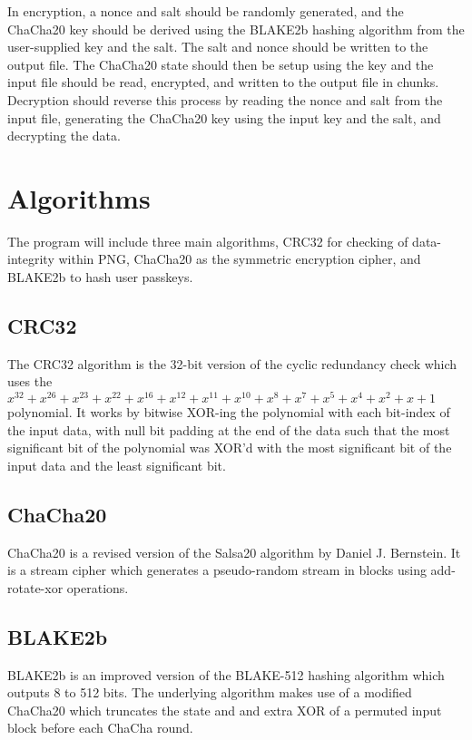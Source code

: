 \documentclass{report}
\begin{document}
In encryption, a nonce and salt should be randomly generated, and the ChaCha20 key should be derived using the BLAKE2b hashing algorithm from the user-supplied key and the salt. The salt and nonce should be written to the output file. The ChaCha20 state should then be setup using the key and the input file should be read, encrypted, and written to the output file in chunks.
Decryption should reverse this process by reading the nonce and salt from the input file, generating the ChaCha20 key using the input key and the salt, and decrypting the data.

\section{Algorithms}

The program will include three main algorithms, CRC32 for checking of data-integrity within PNG, ChaCha20 as the symmetric encryption cipher, and BLAKE2b to hash user passkeys.

\subsection{CRC32}

The CRC32 algorithm is the 32-bit version of the cyclic redundancy check which uses the $x^{32}+x^{26}+x^{23}+x^{22}+x^{16}+x^{12}+x^{11}+x^{10}+x^8+x^7+x^5+x^4+x^2+x+1$ polynomial. It works by bitwise XOR-ing the polynomial with each bit-index of the input data, with null bit padding at the end of the data such that the most significant bit of the polynomial was XOR'd with the most significant bit of the input data and the least significant bit. 

\subsection{ChaCha20}

ChaCha20 is a revised version of the Salsa20 algorithm \cite{salsa20} by Daniel J. Bernstein. It is a stream cipher which generates a pseudo-random stream in blocks using add-rotate-xor operations. 

\subsection{BLAKE2b}

BLAKE2b is an improved version of the BLAKE-512 hashing algorithm which outputs 8 to 512 bits. The underlying algorithm makes use of a modified ChaCha20 which truncates the state and and extra XOR of a permuted input block before each ChaCha round.
\end{document}
